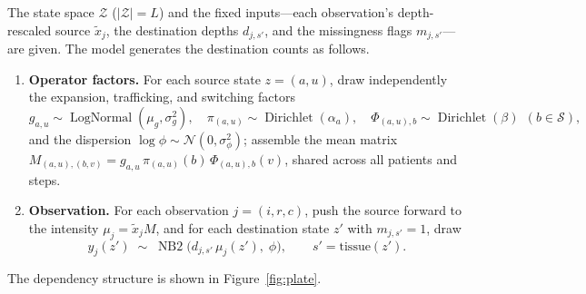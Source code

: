 \documentclass[11pt]{article}
\newcommand{\Zsp}{\mathcal{Z}}                    %
\newcommand{\Ssp}{\mathcal{S}}                    %
\DeclareMathOperator{\Dir}{Dirichlet}
\theoremstyle{definition}
\begin{document}
\begin{keybox}[title={Generative model}]
The state space $\Zsp$ ($|\Zsp| = L$) and the fixed inputs---each observation's
depth-rescaled source $\tilde{x}_j$, the destination depths $d_{j,s'}$, and the
missingness flags $m_{j,s'}$---are given. The model generates the destination
counts as follows.
\begin{enumerate}[leftmargin=2em, itemsep=4pt]
  \item \textbf{Operator factors.} For each source state $z=(a,u)$, draw
        independently the expansion, trafficking, and switching factors
        \[
          g_{a,u} \sim \operatorname{LogNormal}(\mu_g,\sigma_g^2),
          \quad
          \pi_{(a,u)} \sim \Dir(\alpha_a),
          \quad
          \Phi_{(a,u),b} \sim \Dir(\beta)\ \ (b\in\Ssp),
        \]
        and the dispersion $\log\phi \sim \mathcal{N}(0,\sigma_\phi^2)$; assemble the
        mean matrix
        $M_{(a,u),(b,v)} = g_{a,u}\,\pi_{(a,u)}(b)\,\Phi_{(a,u),b}(v)$, shared
        across all patients and steps.

  \item \textbf{Observation.} For each observation $j = (i,r,c)$, push the source
        forward to the intensity $\mu_j = \tilde{x}_j M$, and for each destination
        state $z'$ with $m_{j,s'} = 1$, draw
        \[
          y_j(z') \;\sim\; \operatorname{NB2}\!\bigl( d_{j,s'}\, \mu_j(z'),\; \phi \bigr),
          \qquad s' = \mathrm{tissue}(z') .
        \]
\end{enumerate}
\end{keybox}

The dependency structure is shown in Figure~\ref{fig:plate}.
\end{document}
